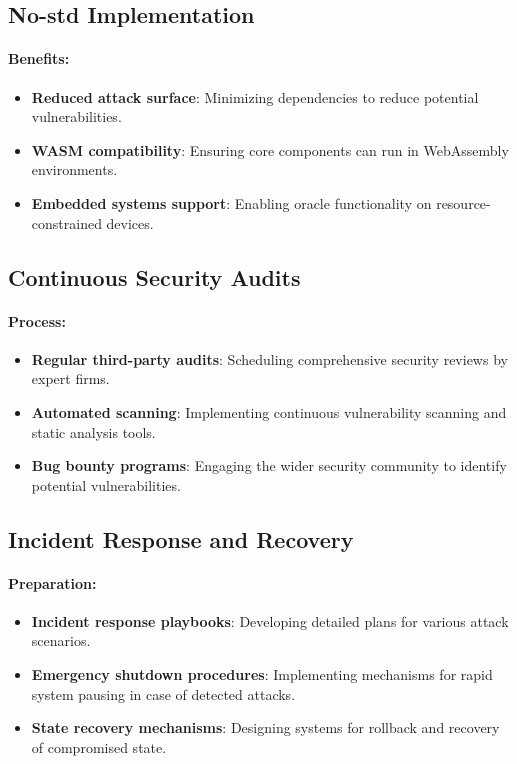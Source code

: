 \documentclass[12pt,a4paper]{article}
\begin{document}
\subsection{No-std Implementation}
\paragraph{Benefits:}
\begin{itemize}
	\item \textbf{Reduced attack surface}: Minimizing dependencies to reduce potential vulnerabilities.
	\item \textbf{WASM compatibility}: Ensuring core components can run in WebAssembly environments.
	\item \textbf{Embedded systems support}: Enabling oracle functionality on resource-constrained devices.
\end{itemize}

\subsection{Continuous Security Audits}
\paragraph{Process:}
\begin{itemize}
	\item \textbf{Regular third-party audits}: Scheduling comprehensive security reviews by expert firms.
	\item \textbf{Automated scanning}: Implementing continuous vulnerability scanning and static analysis tools.
	\item \textbf{Bug bounty programs}: Engaging the wider security community to identify potential vulnerabilities.
\end{itemize}

\subsection{Incident Response and Recovery}
\paragraph{Preparation:}
\begin{itemize}
	\item \textbf{Incident response playbooks}: Developing detailed plans for various attack scenarios.
	\item \textbf{Emergency shutdown procedures}: Implementing mechanisms for rapid system pausing in case of detected attacks.
	\item \textbf{State recovery mechanisms}: Designing systems for rollback and recovery of compromised state.
\end{itemize}
\end{document}
